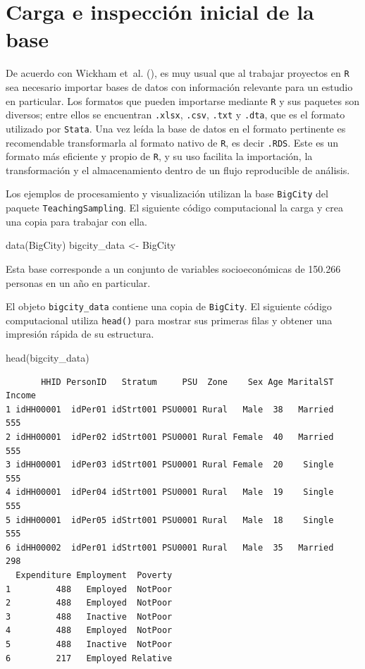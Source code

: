 \documentclass[
  spanish,
  11pt,
  letterpaper,
  oneside,
  open=any]{scrbook}
\newenvironment{Shaded}{\begin{snugshade}}{\end{snugshade}}
\newcommand{\FunctionTok}[1]{\textcolor[rgb]{0.28,0.35,0.67}{#1}}
\newcommand{\NormalTok}[1]{\textcolor[rgb]{0.00,0.23,0.31}{#1}}
\newcommand{\OtherTok}[1]{\textcolor[rgb]{0.00,0.23,0.31}{#1}}
\begin{document}
\section{Carga e inspección inicial de la
base}\label{carga-e-inspeccion-inicial-de-la-base}

De acuerdo con Wickham et~al. (), es
muy usual que al trabajar proyectos en \texttt{R} sea necesario importar
bases de datos con información relevante para un estudio en particular.
Los formatos que pueden importarse mediante \texttt{R} y sus paquetes
son diversos; entre ellos se encuentran \texttt{.xlsx}, \texttt{.csv},
\texttt{.txt} y \texttt{.dta}, que es el formato utilizado por
\texttt{Stata}. Una vez leída la base de datos en el formato pertinente
es recomendable transformarla al formato nativo de \texttt{R}, es decir
\texttt{.RDS}. Este es un formato más eficiente y propio de \texttt{R},
y su uso facilita la importación, la transformación y el almacenamiento
dentro de un flujo reproducible de análisis.

Los ejemplos de procesamiento y visualización utilizan la base
\texttt{BigCity} del paquete \texttt{TeachingSampling}. El siguiente
código computacional la carga y crea una copia para trabajar con ella.

\begin{Shaded}
\begin{Highlighting}[]
\FunctionTok{data}\NormalTok{(BigCity)}
\NormalTok{bigcity\_data }\OtherTok{\textless{}{-}}\NormalTok{ BigCity}
\end{Highlighting}
\end{Shaded}

Esta base corresponde a un conjunto de variables socioeconómicas de
150.266 personas en un año en particular.

El objeto \texttt{bigcity\_data} contiene una copia de \texttt{BigCity}.
El siguiente código computacional utiliza \texttt{head()} para mostrar
sus primeras filas y obtener una impresión rápida de su estructura.

\begin{Shaded}
\begin{Highlighting}[]
\FunctionTok{head}\NormalTok{(bigcity\_data)}
\end{Highlighting}
\end{Shaded}

\begin{verbatim}
       HHID PersonID   Stratum     PSU  Zone    Sex Age MaritalST Income
1 idHH00001  idPer01 idStrt001 PSU0001 Rural   Male  38   Married    555
2 idHH00001  idPer02 idStrt001 PSU0001 Rural Female  40   Married    555
3 idHH00001  idPer03 idStrt001 PSU0001 Rural Female  20    Single    555
4 idHH00001  idPer04 idStrt001 PSU0001 Rural   Male  19    Single    555
5 idHH00001  idPer05 idStrt001 PSU0001 Rural   Male  18    Single    555
6 idHH00002  idPer01 idStrt001 PSU0001 Rural   Male  35   Married    298
  Expenditure Employment  Poverty
1         488   Employed  NotPoor
2         488   Employed  NotPoor
3         488   Inactive  NotPoor
4         488   Employed  NotPoor
5         488   Inactive  NotPoor
6         217   Employed Relative
\end{verbatim}
\end{document}
